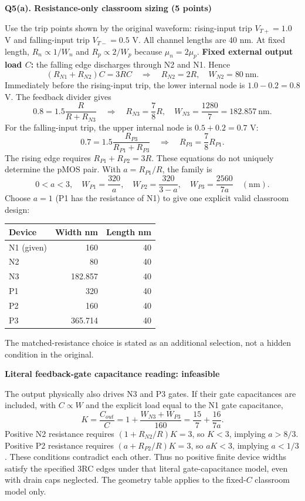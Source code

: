 \documentclass[10pt]{article}
\newcommand{\qheading}[1]{\par\medskip\textbf{#1}\par}
\begin{document}
\newpage
\qheading{Q5(a). Resistance-only classroom sizing (5 points)}
Use the trip points shown by the original waveform: rising-input trip $V_{T+}=1.0$ V and falling-input trip $V_{T-}=0.5$ V. All channel lengths are 40 nm. At fixed length, $R_n\propto1/W_n$ and $R_p\propto2/W_p$ because $\mu_n=2\mu_p$.
\textbf{Fixed external output load $C$:} the falling edge discharges through N2 and N1. Hence
\[
(R_{N1}+R_{N2})C=3RC\quad\Rightarrow\quad R_{N2}=2R,\quad W_{N2}=80\ \mathrm{nm}.
\]
Immediately before the rising-input trip, the lower internal node is $1.0-0.2=0.8$ V. The feedback divider gives
\[
0.8=1.5\frac{R}{R+R_{N3}}\quad\Rightarrow\quad
R_{N3}=\frac78R,\quad W_{N3}=\frac{1280}{7}=182.857\ \mathrm{nm}.
\]
For the falling-input trip, the upper internal node is $0.5+0.2=0.7$ V:
\[
0.7=1.5\frac{R_{P3}}{R_{P1}+R_{P3}}\quad\Rightarrow\quad R_{P3}=\frac78R_{P1}.
\]
The rising edge requires $R_{P1}+R_{P2}=3R$. These equations do not uniquely determine the pMOS pair. With $a=R_{P1}/R$, the family is
\[
0<a<3,\quad W_{P1}=\frac{320}{a},\quad W_{P2}=\frac{320}{3-a},\quad
W_{P3}=\frac{2560}{7a}\quad(\mathrm{nm}).
\]
Choose $a=1$ (P1 has the resistance of N1) to give one explicit valid classroom design:
\begin{center}\begin{tabular}{lrr}\toprule
Device&Width nm&Length nm\\\midrule
N1 (given)&160&40\\N2&80&40\\N3&182.857&40\\P1&320&40\\P2&160&40\\P3&365.714&40\\\bottomrule
\end{tabular}\end{center}
The matched-resistance choice is stated as an additional selection, not a hidden condition in the original.
\qheading{Literal feedback-gate capacitance reading: infeasible}
The output physically also drives N3 and P3 gates. If their gate capacitances are included, with $C\propto W$ and the explicit load equal to the N1 gate capacitance,
\[
K=\frac{C_{out}}{C}=1+\frac{W_{N3}+W_{P3}}{160}=\frac{15}{7}+\frac{16}{7a}.
\]
Positive N2 resistance requires $(1+R_{N2}/R)K=3$, so $K<3$, implying $a>8/3$. Positive P2 resistance requires $(a+R_{P2}/R)K=3$, so $aK<3$, implying $a<1/3$. These conditions contradict each other. Thus no positive finite device widths satisfy the specified 3RC edges under that literal gate-capacitance model, even with drain caps neglected. The geometry table applies to the fixed-$C$ classroom model only.
\end{document}
